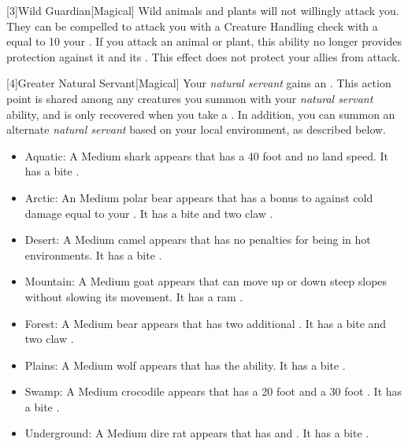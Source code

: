         [3]{Wild Guardian}[Magical] Wild animals and plants will not willingly attack you.
        They can be compelled to attack you with a Creature Handling check with a  equal to 10 \add your .
        If you attack an animal or plant, this ability no longer provides protection against it and its .
        This effect does not protect your allies from attack.

        [4]{Greater Natural Servant}[Magical] Your \textit{natural servant} gains an .
        This action point is shared among any creatures you summon with your \textit{natural servant} ability, and is only recovered when you take a .
        In addition, you can summon an alternate \textit{natural servant} based on your local environment, as described below.
        \begin{itemize}
            \item Aquatic: A Medium shark appears that has a 40 foot  and no land speed.
                It has a bite .
            \item Arctic: An Medium polar bear appears that has a bonus to  against cold damage equal to your .
                It has a bite  and two claw .
            \item Desert: A Medium camel appears that has no penalties for being in hot environments.
                It has a bite .
            \item Mountain: A Medium goat appears that can move up or down steep slopes without slowing its movement.
                It has a ram .
            \item Forest: A Medium bear appears that has two additional .
                It has a bite  and two claw .
            \item Plains: A Medium wolf appears that has the  ability.
                It has a bite .
            \item Swamp: A Medium crocodile appears that has a 20 foot  and a 30 foot .
                It has a bite .
            \item Underground: A Medium dire rat appears that has  and .
                It has a bite .
        \end{itemize}

